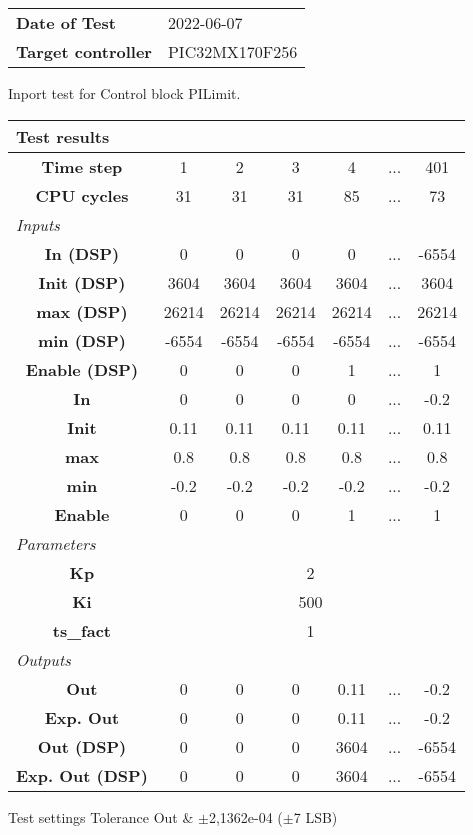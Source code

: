 \begin{tabular}{l l}
\textbf{Date of Test} & 2022-06-07 \tabularnewline
\textbf{Target controller} & PIC32MX170F256 \tabularnewline
\end{tabular}
\vspace{1ex}
Inport test for Control block PILimit.

\vspace{1em}
\begin{tabularx}{\textwidth}{|c|c|c|c|c|>{\centering\arraybackslash}X|c|}
\hline
\multicolumn{7}{|l|}{\cellcolor[gray]{0.8}\textbf{Test results}} \tabularnewline \hline
\textbf{Time step} & 1 & 2 & 3 & 4 & ... & 401 \tabularnewline \hline
\textbf{CPU cycles} & 31 & 31 & 31 & 85 & ... & 73 \tabularnewline \hline
\multicolumn{7}{|l|}{\cellcolor[gray]{0.9}\textit{Inputs}} \tabularnewline \hline
\textbf{In (DSP)} & 0 & 0 & 0 & 0 & ... & -6554 \tabularnewline \hline
\textbf{Init (DSP)} & 3604 & 3604 & 3604 & 3604 & ... & 3604 \tabularnewline \hline
\textbf{max (DSP)} & 26214 & 26214 & 26214 & 26214 & ... & 26214 \tabularnewline \hline
\textbf{min (DSP)} & -6554 & -6554 & -6554 & -6554 & ... & -6554 \tabularnewline \hline
\textbf{Enable (DSP)} & 0 & 0 & 0 & 1 & ... & 1 \tabularnewline \hline
\textbf{In} & 0 & 0 & 0 & 0 & ... & -0.2 \tabularnewline \hline
\textbf{Init} & 0.11 & 0.11 & 0.11 & 0.11 & ... & 0.11 \tabularnewline \hline
\textbf{max} & 0.8 & 0.8 & 0.8 & 0.8 & ... & 0.8 \tabularnewline \hline
\textbf{min} & -0.2 & -0.2 & -0.2 & -0.2 & ... & -0.2 \tabularnewline \hline
\textbf{Enable} & 0 & 0 & 0 & 1 & ... & 1 \tabularnewline \hline
\multicolumn{7}{|l|}{\cellcolor[gray]{0.9}\textit{Parameters}} \tabularnewline \hline
\textbf{Kp} & \multicolumn{6}{c|}{2} \tabularnewline \hline
\textbf{Ki} & \multicolumn{6}{c|}{500} \tabularnewline \hline
\textbf{ts\_fact} & \multicolumn{6}{c|}{1} \tabularnewline \hline
\multicolumn{7}{|l|}{\cellcolor[gray]{0.9}\textit{Outputs}} \tabularnewline \hline
\textbf{Out} & 0 & 0 & 0 & 0.11 & ... & -0.2 \tabularnewline \hline
\textbf{Exp. Out} & 0 & 0 & 0 & 0.11 & ... & -0.2 \tabularnewline \hline
\textbf{Out (DSP)} & 0 & 0 & 0 & 3604 & ... & -6554 \tabularnewline \hline
\textbf{Exp. Out (DSP)} & 0 & 0 & 0 & 3604 & ... & -6554 \tabularnewline \hline
\end{tabularx}
\vspace{1ex}

\begin{XtoCtabular}{Test settings}
Tolerance Out & $\pm$2,1362e-04 ($\pm$7 LSB) \tabularnewline \hline
\end{XtoCtabular}

